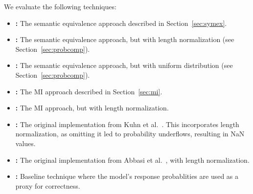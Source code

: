 We evaluate the following techniques:
\begin{itemize}[leftmargin=*]
\item \textbf{\SESymbolicRaw:} The semantic equivalence approach described in Section~\ref{sec:symex}.
    

\item \textbf{\SESymbolic:} The semantic equivalence approach, but with length normalization (see Section~\ref{sec:probcomp}).
\item \textbf{\SESymbolicUnif:} The semantic equivalence approach, but with uniform distribution (see Section~\ref{sec:probcomp}).  

    \item \textbf{\MISymbolicRaw:} The MI approach described in Section~\ref{sec:mi}.
                        
    \item \textbf{\MISymbolic:} The MI approach, but with length normalization. %
    \item \textbf{\SEOriginal:} The original implementation from Kuhn et al.~\cite{kuhnsemantic}. This incorporates length normalization, as omitting it led to probability underflows, resulting in NaN values.
    \item \textbf{\MIOriginal:} The original implementation from Abbasi et al.~\cite{abbasi2024believe}, with length normalization.
    \item \textbf{\LLMProbability:} Baseline technique where the model's response probablities are used as a proxy for correctness. 
\end{itemize}


